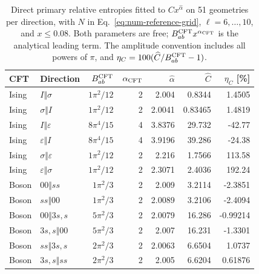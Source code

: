 \begin{table}[htbp]\centering\small
\begin{tabular}{llrrrrr}\toprule
CFT & Direction & $B_{ab}^{\rm CFT}$ & $\alpha_{\rm CFT}$ & $\widehat\alpha$ & $\widehat C$ & $\eta_C$ [\%]\\\midrule
Ising & $I\Vert \sigma$ & $1\pi^{2}/12$ & 2 & 2.004 & 0.8344 & 1.4505\\
Ising & $\sigma\Vert I$ & $1\pi^{2}/12$ & 2 & 2.0041 & 0.83465 & 1.4819\\
Ising & $I\Vert \varepsilon$ & $8\pi^{4}/15$ & 4 & 3.8376 & 29.732 & -42.77\\
Ising & $\varepsilon\Vert I$ & $8\pi^{4}/15$ & 4 & 3.9196 & 39.286 & -24.38\\
Ising & $\sigma\Vert \varepsilon$ & $1\pi^{2}/12$ & 2 & 2.216 & 1.7566 & 113.58\\
Ising & $\varepsilon\Vert \sigma$ & $1\pi^{2}/12$ & 2 & 2.3071 & 2.4036 & 192.24\\
\midrule
Boson & $00\Vert ss$ & $1\pi^{2}/3$ & 2 & 2.009 & 3.2114 & -2.3851\\
Boson & $ss\Vert 00$ & $1\pi^{2}/3$ & 2 & 2.0089 & 3.2106 & -2.4094\\
Boson & $00\Vert 3s,s$ & $5\pi^{2}/3$ & 2 & 2.0079 & 16.286 & -0.99214\\
Boson & $3s,s\Vert 00$ & $5\pi^{2}/3$ & 2 & 2.007 & 16.231 & -1.3301\\
Boson & $ss\Vert 3s,s$ & $2\pi^{2}/3$ & 2 & 2.0063 & 6.6504 & 1.0737\\
Boson & $3s,s\Vert ss$ & $2\pi^{2}/3$ & 2 & 2.005 & 6.6204 & 0.61876\\
\bottomrule\end{tabular}
\caption{Direct primary relative entropies fitted to $Cx^{\widehat\alpha}$ on 51 geometries per direction, with $N$ in Eq.~\eqref{eq:num-reference-grid}, $\ell=6,\ldots,10$, and $x\leq0.08$. Both parameters are free; $B_{ab}^{\rm CFT}x^{\alpha_{\rm CFT}}$ is the analytical leading term. The amplitude convention includes all powers of $\pi$, and $\eta_C=100(\widehat C/B_{ab}^{\rm CFT}-1)$.}\label{tab:num-primary}
\end{table}
